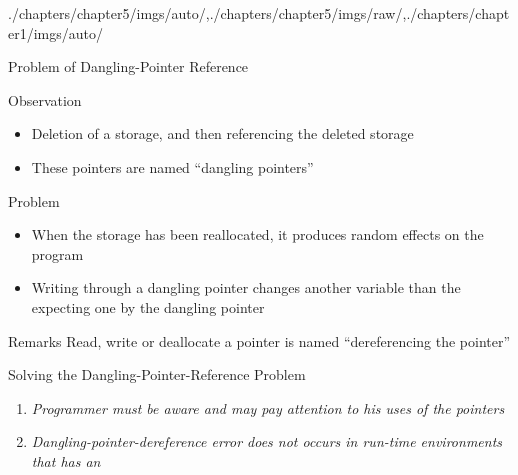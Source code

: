 \begin{graphicspathcontext}{{./chapters/chapter5/imgs/auto/},{./chapters/chapter5/imgs/raw/},{./chapters/chapter1/imgs/auto/}}
\begin{bibunit}[apalike]
\begin{frame}{Problem of Dangling-Pointer Reference}
	\begin{small}
		\begin{block}{Observation}
			\begin{itemize}
				\item Deletion of a storage, and then referencing the deleted storage
				\item These pointers are named ``dangling pointers''
			\end{itemize}
		\end{block}
		\begin{alertblock}{Problem}
			\begin{itemize}
				\item When the storage has been reallocated, it produces random effects on the program
				\item Writing through a dangling pointer changes another variable than the expecting one by the dangling pointer
			\end{itemize}
		\end{alertblock}
		\begin{block}{Remarks}
			Read, write or deallocate a pointer is named ``dereferencing the pointer''
		\end{block}
	\end{small}
\end{frame}

\begin{frame}{Solving the Dangling-Pointer-Reference Problem}
	\vspace{1cm}
	\begin{enumerate}
		\item \emph{Programmer must be aware and may pay attention to his uses of the pointers}
		\vspace{.5cm}
		\item \emph{Dangling-pointer-dereference error does not occurs in run-time environments that has an }
	\end{enumerate}
\end{frame}


\end{bibunit}
\end{graphicspathcontext}
